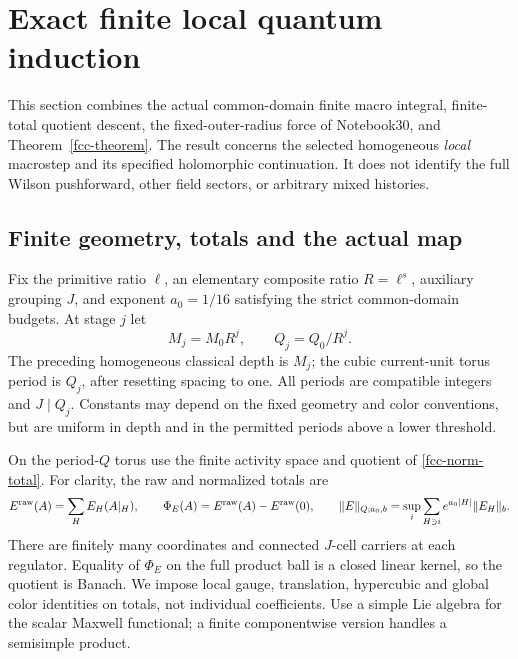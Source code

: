 \section{Exact finite local quantum induction}
\label{fqi-section}

This section combines the actual common-domain finite macro integral,
finite-total quotient descent, the fixed-outer-radius force of
Notebook30, and Theorem~\ref{fcc-theorem}. The result concerns the
selected homogeneous \emph{local} macrostep and its specified
holomorphic continuation. It does not identify the full Wilson
pushforward, other field sectors, or arbitrary mixed histories.

\subsection{Finite geometry, totals and the actual map}
\label{fqi-setup-section}

Fix the primitive ratio $\ell$, an elementary composite ratio
$R=\ell^s$, auxiliary grouping $J$, and exponent $a_0=1/16$
satisfying the strict common-domain budgets. At stage $j$ let
\begin{equation}
 M_j=M_0R^j,\qquad Q_j=Q_0/R^j.
 \label{fqi-scales}
\end{equation}
The preceding homogeneous classical depth is $M_j$; the cubic
current-unit torus period is $Q_j$, after resetting spacing to one.
All periods are compatible integers and $J\mid Q_j$. Constants
may depend on the fixed geometry and color conventions, but are
uniform in depth and in the permitted periods above a lower
threshold.

On the period-$Q$ torus use the finite activity space and quotient
of \eqref{fcc-norm-total}. For clarity, the raw and normalized totals
are
\begin{equation}
 E^{\rm raw}(A)=\sum_HE_H(A|_H),\qquad
 \Phi_E(A)=E^{\rm raw}(A)-E^{\rm raw}(0),\qquad
 \|E\|_{Q;a_0,b}=\sup_i\sum_{H\ni i}e^{a_0|H|}\|E_H\|_b.
 \label{fqi-totals}
\end{equation}
There are finitely many coordinates and connected $J$-cell carriers
at each regulator. Equality of $\Phi_E$ on the full product ball
is a closed linear kernel, so the quotient is Banach. We impose
local gauge, translation, hypercubic and global color identities
on totals, not individual coefficients. Use a simple Lie algebra
for the scalar Maxwell functional; a finite componentwise version
handles a semisimple product.

